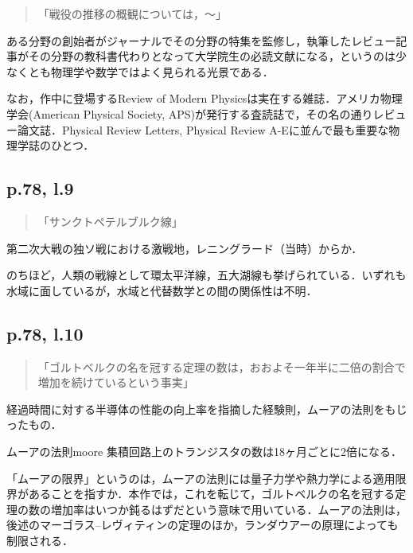 \documentclass[10pt, a5paper, twoside]{ltjsarticle}
\newcommand{\hyphen}{\insertkanjiskip--\insertkanjiskip}
\begin{document}
            \begin{quote}
                「戦役の推移の概観については，〜」
            \end{quote}

            ある分野の創始者がジャーナルでその分野の特集を監修し，執筆したレビュー記事がその分野の教科書代わりとなって大学院生の必読文献になる，というのは少なくとも物理学や数学ではよく見られる光景である．

            なお，作中に登場するReview of Modern Physicsは実在する雑誌．アメリカ物理学会(American Physical Society, APS)が発行する査読誌で，その名の通りレビュー論文誌．Physical Review Letters, Physical Review A-Eに並んで最も重要な物理学誌のひとつ．

        \subsection{p.78, l.9}

            \begin{quote}
                「サンクトペテルブルク線」
            \end{quote}

            第二次大戦の独ソ戦における激戦地，レニングラード（当時）からか．

            のちほど，人類の戦線として環太平洋線，五大湖線も挙げられている．いずれも水域に面しているが，水域と代替数学との間の関係性は不明．

        \subsection{p.78, l.10}

            \begin{quote}
                「ゴルトベルクの名を冠する定理の数は，おおよそ一年半に二倍の割合で増加を続けているという事実」
            \end{quote}

            経過時間に対する半導体の性能の向上率を指摘した経験則，ムーアの法則をもじったもの．

            \begin{dfn}{ムーアの法則}{moore}
                集積回路上のトランジスタの数は18ヶ月ごとに2倍になる．
            \end{dfn}

            「ムーアの限界」というのは，ムーアの法則には量子力学や熱力学による適用限界があることを指すか．本作では，これを転じて，ゴルトベルクの名を冠する定理の数の増加率はいつか鈍るはずだという意味で用いている．ムーアの法則は，後述のマーゴラス\hyphen レヴィティンの定理のほか，ランダウアーの原理によっても制限される．
\end{document}
